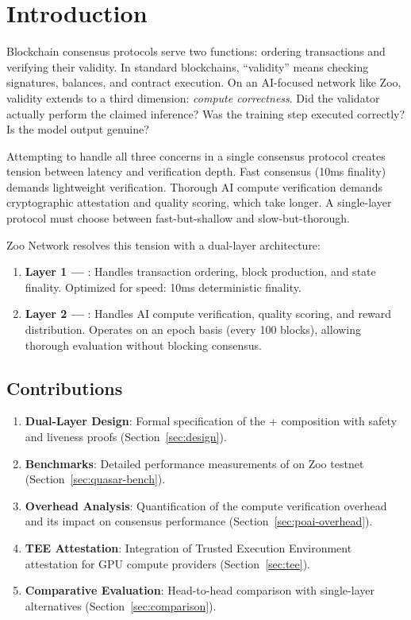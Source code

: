 \section{Introduction}


Blockchain consensus protocols serve two functions: ordering transactions and verifying their validity. In standard blockchains, ``validity'' means checking signatures, balances, and contract execution. On an AI-focused network like Zoo, validity extends to a third dimension: \emph{compute correctness}. Did the validator actually perform the claimed inference? Was the training step executed correctly? Is the model output genuine?

Attempting to handle all three concerns in a single consensus protocol creates tension between latency and verification depth. Fast consensus (10ms finality) demands lightweight verification. Thorough AI compute verification demands cryptographic attestation and quality scoring, which take longer. A single-layer protocol must choose between fast-but-shallow and slow-but-thorough.

Zoo Network resolves this tension with a dual-layer architecture:

\begin{enumerate}
    \item \textbf{Layer 1 --- \Quasar{}}: Handles transaction ordering, block production, and state finality. Optimized for speed: 10ms deterministic finality.

    \item \textbf{Layer 2 --- \PoAI{}}: Handles AI compute verification, quality scoring, and reward distribution. Operates on an epoch basis (every 100 blocks), allowing thorough evaluation without blocking consensus.
\end{enumerate}

\subsection{Contributions}

\begin{enumerate}
    \item \textbf{Dual-Layer Design}: Formal specification of the \Quasar{} + \PoAI{} composition with safety and liveness proofs (Section~\ref{sec:design}).

    \item \textbf{\Quasar{} Benchmarks}: Detailed performance measurements of \Quasar{} on Zoo testnet (Section~\ref{sec:quasar-bench}).

    \item \textbf{\PoAI{} Overhead Analysis}: Quantification of the compute verification overhead and its impact on consensus performance (Section~\ref{sec:poai-overhead}).

    \item \textbf{TEE Attestation}: Integration of Trusted Execution Environment attestation for GPU compute providers (Section~\ref{sec:tee}).

    \item \textbf{Comparative Evaluation}: Head-to-head comparison with single-layer alternatives (Section~\ref{sec:comparison}).
\end{enumerate}

